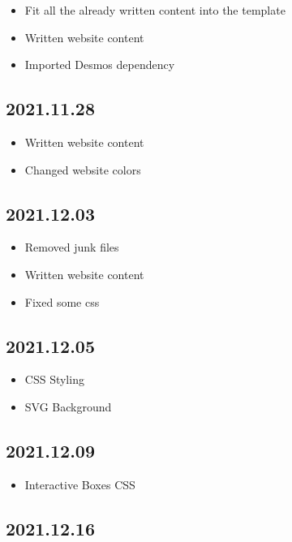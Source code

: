\documentclass{article}
\begin{document}
\begin{itemize}
    \item Fit all the already written content into the template
    \item Written website content
    \item Imported Desmos dependency
\end{itemize}

\subsection*{2021.11.28}

\begin{itemize}
    \item Written website content
    \item Changed website colors
\end{itemize}

\subsection*{2021.12.03}

\begin{itemize}
    \item Removed junk files
    \item Written website content
    \item Fixed some css
\end{itemize}

\subsection*{2021.12.05}

\begin{itemize}
    \item CSS Styling
    \item SVG Background
\end{itemize}

\subsection*{2021.12.09}

\begin{itemize}
    \item Interactive Boxes CSS
\end{itemize}

\subsection*{2021.12.16}
\end{document}
